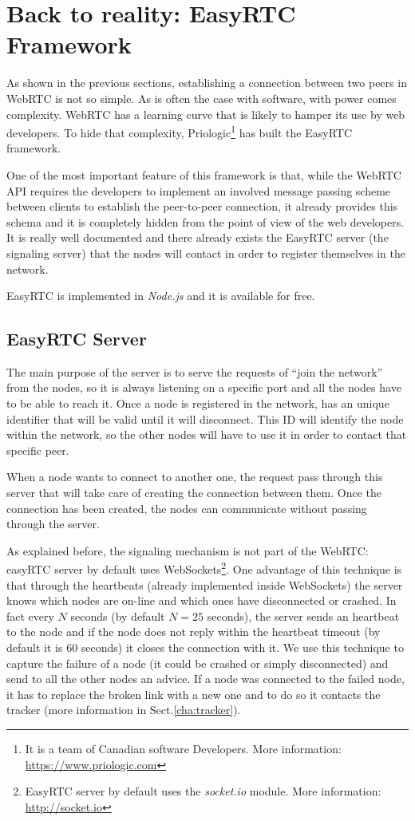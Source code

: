 \section{Back to reality: EasyRTC Framework}
\label{sec:easy_tc}
As shown in the previous sections, establishing a connection between two peers in WebRTC is not so simple.
As is often the case with software, with power comes complexity. WebRTC has a learning curve that is likely to hamper its use by web developers. To hide that complexity, Priologic\footnote{It is a team of Canadian software Developers. More information: \url{https://www.priologic.com}} has built the EasyRTC framework.

One of the most important feature of this framework is that, while the WebRTC API requires the developers to implement an involved message passing scheme between clients to establish the peer-to-peer connection, it already provides this schema\cite{easyrtc} and it is completely hidden from the point of view of the web developers. It is really well documented and there already exists the EasyRTC server (the signaling server) that the nodes will contact in order to register themselves in the network.

EasyRTC is implemented in \textit{Node.js} and it is available for free.

\subsection{EasyRTC Server}
\label{subsec:easyrtc_server}
The main purpose of the server is to serve the requests of ``join the network'' from the nodes, so it is always listening on a specific port and all the nodes have to be able to reach it. Once a node is registered in the network, has an unique identifier that will be valid until it will disconnect. This ID will identify the node within the network, so the other nodes will have to use it in order to contact that specific peer. 

When a node wants to connect to another one, the request pass through this server that will take care of creating the connection between them. Once the connection has been created, the nodes can communicate without passing through the server. 

As explained before, the signaling mechanism is not part of the WebRTC: easyRTC server by default uses WebSockets\footnote{EasyRTC server by default uses the \emph{socket.io} module. More information: \url{http://socket.io}}. One advantage of this technique is that through the heartbeats (already implemented inside WebSockets) the server knows which nodes are on-line and which ones have disconnected or crashed. In fact every $N$ seconds (by default $N = 25$ seconds), the server sends an heartbeat to the node and if the node does not reply within the heartbeat timeout (by default it is 60 seconds) it closes the connection with it. We use this technique to capture the failure of a node (it could be crashed or simply disconnected) and send to all the other nodes an advice. If a node was connected to the failed node, it has to replace the broken link with a new one and to do so it contacts the tracker (more information in Sect.\ref{cha:tracker}).

